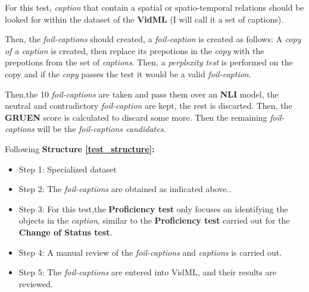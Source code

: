 For this test, \textit{caption} that contain a spatial or spatio-temporal relations should be looked for within the dataset of the \textbf{VidML} (I will call it a set of captions).

Then, the \textit{foil-captions} should created, a \textit{foil-caption} is created as follows:
A \textit{copy of a caption} is created, then replace its prepotions in the \textit{copy} with the prepotions from the set of \textit{captions}. Then, a \textit{perplexity test} is performed on the copy and if the \textit{copy} passes the test it would be a valid \textit{foil-caption}.

Then,the 10 \textit{foil-captions} are taken and pass them over an \textbf{NLI} model, the neutral and contradictory \textit{foil-caption} are kept, the rest is discarted. Then, the \textbf{GRUEN} score is calculated to discard some more.
Then the remaining \textit{foil-captions} will be the \textit{foil-captions candidates}.

Following \textbf{Structure \ref{test_structure}:}
\begin{itemize}
\item Step 1: Specialized dataset
\item Step 2: The \textit{foil-captions} are obtained as indicated above..
\item Step 3: For this test,the \textbf{Proficiency test} only focuses on identifying the objects in the \textit{caption}, similar to the \textbf{Proficiency test} carried out for the \textbf{Change of Status test}.
\item Step 4: A manual review of the \textit{foil-captions} and \textit{captions} is carried out.
\item Step 5: The \textit{foil-captions} are entered into VidML, and their results are reviewed.
\end{itemize}

